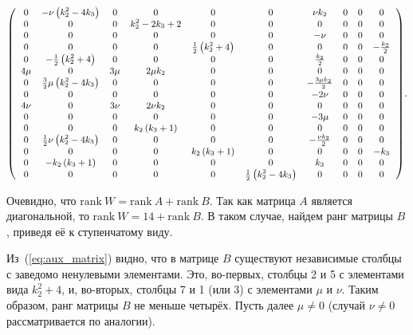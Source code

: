 \documentclass[../main.tex]{subfiles}
\begin{document}
\begin{equation}\label{eq:aux_matrix}
{\small\left(
\begin{array}{cccccccccc}
 0 & -\nu  \left(k_2^2-4 k_3\right) & 0 & 0 & 0 & 0 & \nu  k_2 & 0 & 0 & 0 \\
 0 & 0 & 0 & k_2^2-2 k_3+2 & 0 & 0 & 0 & 0 & 0 & 0 \\
 0 & 0 & 0 & 0 & 0 & 0 & -\nu  & 0 & 0 & 0 \\
 0 & 0 & 0 & 0 & \frac{1}{2} \left(k_2^2+4\right) & 0 & 0 & 0 & 0 & -\frac{k_2}{2} \\
 0 & -\frac{1}{2} \left(k_2^2+4\right) & 0 & 0 & 0 & 0 & \frac{k_2}{2} & 0 & 0 & 0 \\
 4 \mu  & 0 & 3 \mu  & 2 \mu  k_2 & 0 & 0 & 0 & 0 & 0 & 0 \\
 0 & \frac{3}{2} \mu  \left(k_2^2-4 k_3\right) & 0 & 0 & 0 & 0 & -\frac{3 \mu  k_2}{2} & 0 & 0 & 0 \\
 0 & 0 & 0 & 0 & 0 & 0 & -2 \nu  & 0 & 0 & 0 \\
 4 \nu  & 0 & 3 \nu  & 2 \nu  k_2 & 0 & 0 & 0 & 0 & 0 & 0 \\
 0 & 0 & 0 & 0 & 0 & 0 & -3 \mu  & 0 & 0 & 0 \\
 0 & 0 & 0 & k_2 \left(k_3+1\right) & 0 & 0 & 0 & 0 & 0 & 0 \\
 0 & \frac{1}{2} \nu  \left(k_2^2-4 k_3\right) & 0 & 0 & 0 & 0 & -\frac{\nu  k_2}{2} & 0 & 0 & 0 \\
 0 & 0 & 0 & 0 & k_2 \left(k_3+1\right) & 0 & 0 & 0 & 0 & -k_3 \\
 0 & -k_2 \left(k_3+1\right) & 0 & 0 & 0 & 0 & k_3 & 0 & 0 & 0 \\
 0 & 0 & 0 & 0 & 0 & \frac{1}{2} \left(k_2^2-4 k_3\right) & 0 & 0 & 0 & 0 \\
\end{array}
\right)}.
\end{equation}

Очевидно, что $\mathrm{rank}~W = \mathrm{rank}~A + \mathrm{rank}~B$. Так как матрица $A$ является диагональной, то $\mathrm{rank}~W = 14 + \mathrm{rank}~B$. В таком случае, найдем ранг матрицы $B$, приведя её к ступенчатому виду.

Из~(\ref{eq:aux_matrix}) видно, что в матрице $B$ существуют независимые столбцы с заведомо ненулевыми элементами. Это, во-первых, столбцы 2 и 5 с элементами вида $k_2^2 + 4$, и, во-вторых, столбцы 7 и 1 (или 3) с элементами $\mu$ и $\nu$. Таким образом, ранг матрицы $B$ не меньше четырёх. Пусть далее $\mu \ne 0$ (случай $\nu \ne 0$ рассматривается по аналогии).
\end{document}
